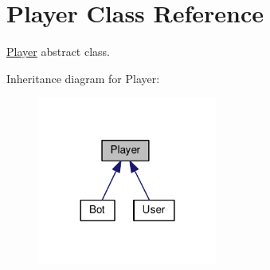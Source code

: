 \hypertarget{classPlayer}{}\section{Player Class Reference}
\label{classPlayer}


\hyperlink{classPlayer}{Player} abstract class.  




Inheritance diagram for Player\+:
\nopagebreak
\begin{figure}[H]
\begin{center}
\leavevmode
\includegraphics[width=168pt]{classPlayer__inherit__graph}
\end{center}
\end{figure}
